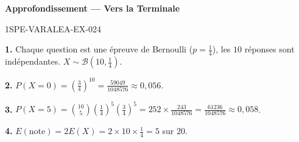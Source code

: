 \begin{center}\textbf{Approfondissement — Vers la Terminale}\end{center}
\begin{corrige}{1SPE-VARALEA-EX-024}

\textbf{1.} Chaque question est une épreuve de Bernoulli ($p = \frac{1}{4}$), les $10$ réponses sont indépendantes. $X \sim \mathcal{B}(10, \frac{1}{4})$.

\medskip
\textbf{2.} $P(X=0) = \left(\frac{3}{4}\right)^{10} = \frac{59049}{1048576} \approx 0{,}056$.

\medskip
\textbf{3.} $P(X=5) = \binom{10}{5}\left(\frac{1}{4}\right)^5\left(\frac{3}{4}\right)^5 = 252 \times \frac{243}{1048576} = \frac{61236}{1048576} \approx 0{,}058$.

\medskip
\textbf{4.} $E(\text{note}) = 2E(X) = 2 \times 10 \times \frac{1}{4} = 5$ sur $20$.

\end{corrige}
